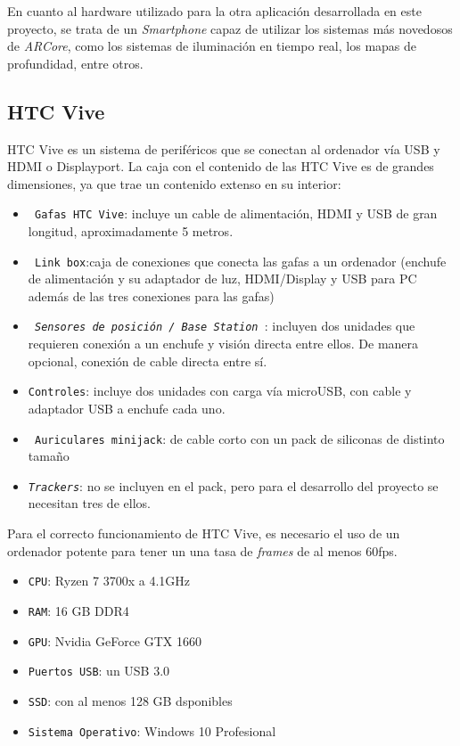 En cuanto al hardware utilizado para la otra aplicación desarrollada en este proyecto, se trata de un \textit{Smartphone} capaz de utilizar los sistemas más novedosos de \textit{ARCore}, como los sistemas de iluminación en tiempo real, los mapas de profundidad, entre otros.

\subsection{HTC Vive}

HTC Vive es un sistema de periféricos que se conectan al ordenador vía USB y HDMI o Displayport. La caja con el contenido de las HTC Vive es de grandes dimensiones, ya que trae un contenido extenso en su interior:

\begin{itemize}
    \item \texttt{ Gafas HTC Vive}: incluye un cable de alimentación, HDMI y USB de gran longitud, aproximadamente 5 metros.
    \item \texttt{ Link box}:caja de conexiones que conecta las gafas a un ordenador (enchufe de alimentación y su adaptador de luz, HDMI/Display y USB para PC además de las tres conexiones para las gafas)
	\item \texttt{ \textit{Sensores de posición / Base Station }}: incluyen dos unidades que requieren conexión a un enchufe y visión directa entre ellos. De manera opcional, conexión de cable directa entre sí.
    \item \texttt{Controles}: incluye dos unidades con carga vía microUSB, con cable y adaptador USB a enchufe cada uno.
    \item \texttt{ Auriculares minijack}: de cable corto con un pack de siliconas de distinto tamaño
    \item \texttt{\textit{Trackers}}: no se incluyen en el pack, pero para el desarrollo del proyecto se necesitan tres de ellos.
\end{itemize}

Para el correcto funcionamiento de HTC Vive, es necesario el uso de un ordenador potente para tener un una tasa de \textit{frames} de al menos 60fps.

\begin{itemize}
    \item \texttt{CPU}: Ryzen 7 3700x a 4.1GHz
    \item \texttt{RAM}: 16 GB DDR4
    \item \texttt{GPU}: Nvidia GeForce GTX 1660
    \item \texttt{Puertos USB}: un USB 3.0
    \item \texttt{SSD}: con al menos 128 GB dsponibles
    \item \texttt{Sistema Operativo}: Windows 10 Profesional
\end{itemize}

